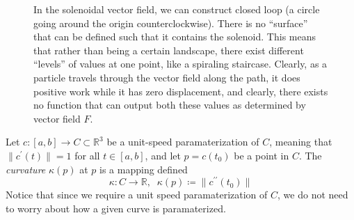 	\begin{figure}[H]
		\centering 
		\caption{In the solenoidal vector field, we can construct closed loop (a circle going around the origin counterclockwise). There is no ``surface'' that can be defined such that it contains the solenoid. This means that rather than being a certain landscape, there exist different ``levels'' of values at one point, like a spiraling staircase. Clearly, as a particle travels through the vector field along the path, it does positive work while it has zero displacement, and clearly, there exists no function that can output both these values as determined by vector field $F$. } 
		\label{fig:solenoid_nonconservative}
	\end{figure}
		
  \begin{definition}
    \label{def:curvature-at-a-point}
		Let $c: [a, b] \to C \subset \mathbb{R}^3$ be a unit-speed paramaterization of $C$, meaning that $\|c^\prime (t)\| = 1$ for all $t \in [a,b]$, and let $p = c(t_0)$ be a point in $C$. The \textit{curvature} $\kappa(p)$ at $p$ is a mapping defined
		\begin{equation}
			\kappa: C \to \mathbb{R}, \;\; \kappa(p) \coloneqq \|c^{\prime \prime} (t_0)\|
		\end{equation}
		Notice that since we require a unit speed paramaterization of $C$, we do not need to worry about how a given curve is paramaterized. 
  \end{definition}
		
